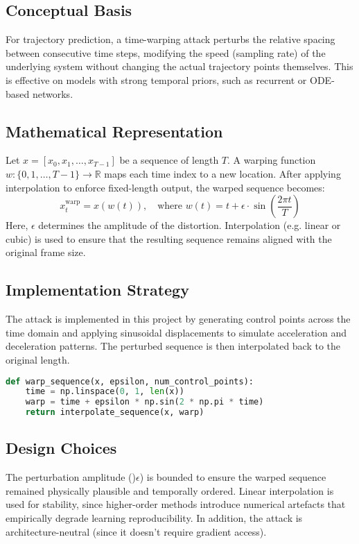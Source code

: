 \subsection*{Conceptual Basis}
For trajectory prediction, a time-warping attack perturbs the relative spacing between consecutive time steps, modifying the speed (sampling rate) of the underlying system without changing the actual trajectory points themselves. This is effective on models with strong temporal priors, such as recurrent or ODE-based networks.

\subsection*{Mathematical Representation}
Let $x = [x_0, x_1, \dots, x_{T-1}]$ be a sequence of length $T$. A warping function $w: \{0, 1, \dots, T-1\} \to \mathbb{R}$ maps each time index to a new location. After applying interpolation to enforce fixed-length output, the warped sequence becomes:
\[
x^{\text{warp}}_t = x(w(t)), \quad \text{where } w(t) = t + \epsilon \cdot \sin\left( \frac{2\pi t}{T} \right)
\]
Here, $\epsilon$ determines the amplitude of the distortion. Interpolation (e.g. linear or cubic) is used to ensure that the resulting sequence remains aligned with the original frame size.

\subsection*{Implementation Strategy}
The attack is implemented in this project by generating control points across the time domain and applying sinusoidal displacements to simulate acceleration and deceleration patterns. The perturbed sequence is then interpolated back to the original length.

\begin{lstlisting}[language=Python, caption={Example Time-Warping Attack Function}]
def warp_sequence(x, epsilon, num_control_points):
    time = np.linspace(0, 1, len(x))
    warp = time + epsilon * np.sin(2 * np.pi * time)
    return interpolate_sequence(x, warp)
\end{lstlisting}

\subsection*{Design Choices}
The perturbation amplitude ()$\epsilon$) is bounded to ensure the warped sequence remained physically plausible and temporally ordered. Linear interpolation is used for stability, since higher-order methods introduce numerical artefacts that empirically degrade learning reproducibility. In addition, the attack is architecture-neutral (since it doesn't require gradient access).

